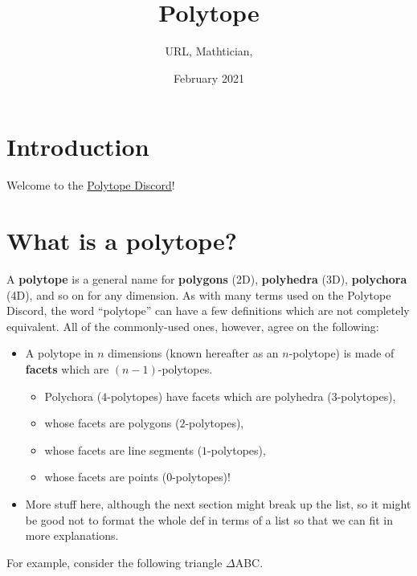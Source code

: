 \documentclass{article}
\title{Polytope}
\author{URL, Mathtician, }
\date{February 2021}
\begin{document}
\maketitle

\section{Introduction}
Welcome to the \href{https://discord.gg/invite/zMRu7T4}{Polytope Discord}!

\section{What is a polytope?}
A \textbf{polytope} is a general name for
\textbf{polygons} (2D), \textbf{polyhedra} (3D), \textbf{polychora} (4D),
and so on for any dimension.
As with many terms used on the Polytope Discord,
the word ``polytope'' can have a few definitions which are not completely equivalent.
All of the commonly-used ones, however, agree on the following:
\begin{itemize}
\item
  A polytope in $n$ dimensions (known hereafter as an $n$-polytope)
  is made of \textbf{facets} which are $(n-1)$-polytopes.
  \begin{itemize}
  \item Polychora ($4$-polytopes) have facets which are polyhedra ($3$-polytopes),
  \item whose facets are polygons ($2$-polytopes),
  \item whose facets are line segments ($1$-polytopes),
  \item whose facets are points ($0$-polytopes)!
  \end{itemize}
\item
  More stuff here, although the next section might break up the list,
  so it might be good not to format the whole def in terms of a list
  so that we can fit in more explanations.
\end{itemize}

For example, consider the following triangle $\Delta$ABC.

\begin{center}
\end{center}
\end{document}
